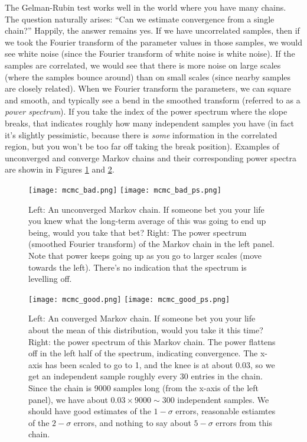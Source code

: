 \documentclass[letterpaper,11pt,preprint]{aastex}
\begin{document}
The Gelman-Rubin test works well in the world where you have many
chains.  The question naturally arises: ``Can we estimate convergence
from a single chain?''  Happily, the answer remains yes.  If we have
uncorrelated samples, then if we took the Fourier transform of the
parameter values in those samples, we would see white noise (since the
Fourier transform of white noise is white noise).  If the samples are
correlated, we would see that there is more noise on large scales
(where the samples bounce around) than on small scales (since nearby
samples are closely related).  When we Fourier transform the
parameters, we can square and smooth, and typically see a bend in the
smoothed transform (referred to as a \textit{power spectrum}).  If you
take the index of the power spectrum where the slope breaks, that
indicates roughly how many independent samples you have (in fact it's
slightly pessimistic, because there is \textit{some} information in
the correlated region, but you won't be too far off taking the break
position).  Examples of unconverged and converge Markov chains and
their corresponding power spectra are showin in Figures
\ref{fig:mcmc_bad} and \ref{fig:mcmc_good}.


\begin{figure}[!h]
  \texttt{[image: mcmc\_bad.png]}
  \texttt{[image: mcmc\_bad\_ps.png]}
  \caption{Left: An unconverged Markov chain.  If someone bet you
    your life you knew what the long-term average of this was going to
    end up being, would you take that bet?  Right: The power spectrum
    (smoothed Fourier transform) of the Markov chain in the left
    panel.  Note that power keeps going up as you go to larger scales
    (move towards the left).  There's no indication that the spectrum
    is levelling off.}
  \label{fig:mcmc_bad}
\end{figure}

\begin{figure}[!h]
  \texttt{[image: mcmc\_good.png]}
  \texttt{[image: mcmc\_good\_ps.png]}
  \caption{Left: An converged Markov chain.  If someone bet you your
    life about the mean of this distribution, would you take it this
    time?  Right: the power spectrum of this Markov chain.  The power
    flattens off in the left half of the spectrum, indicating
    convergence.  The x-axis has been scaled to go to 1, and the knee
    is at about 0.03, so we get an independent sample roughly every 30
    entries in the chain.  Since the chain is 9000 samples long (from
    the x-axis of the left panel), we have about
    $0.03\times9000\sim 300$ independent samples.  We should have good
    estimates of the $1-\sigma$ errors, reasonable estiamtes of the
    $2-\sigma$ errors, and nothing to say about $5-\sigma$ errors from
    this chain.}
  \label{fig:mcmc_good}
\end{figure}
\end{document}
